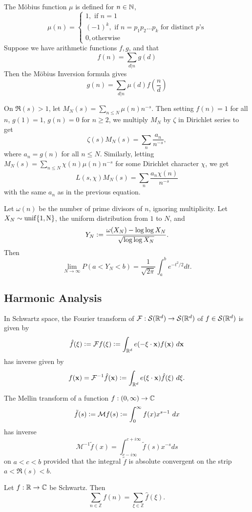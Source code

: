 \begin{theorem}
	The M\"obius function $\mu$ is defined for $n\in\mathbb{N}$,
	\[
		\mu(n) = \begin{cases}
			1, \textrm{ if } n=1\\
			(-1)^k, \textrm{ if }n=p_1p_2...p_k\textrm{ for distinct }p\textrm{'s}\\
			0, \textrm {otherwise}
		\end{cases}
	\]
	Suppose we have arithmetic functions $f,g$, and that\[
		f(n) = \sum_{d|n} g(d)
	\]
	Then the M\"obius Inversion formula gives 
	\[
		g(n) = \sum_{d|n} \mu(d) f\left(\frac{n}{d}\right)
	\]
\end{theorem}
\begin{example}
	On $\Re(s)>1$, let $M_N(s) = \sum_{n\leq N} \mu(n)n^{-s}$.
	Then setting $f(n)=1$ for all $n$, $g(1)=1$, $g(n)=0$ for $n\geq 2$, we multiply $M_N$ by $\zeta$ in Dirichlet series to get\[
		\zeta(s)M_N(s) = \sum_{n} \frac{a_n}{n^{-s}},
	\]
	where $a_n=g(n)$ for all $n\leq N$.
	Similarly, letting $M_N(s) = \sum_{n\leq N} \chi(n) \mu(n) n^{-s}$ for some Dirichlet character $\chi$,
	we get \[
		L(s,\chi)M_N(s) = \sum_{n} \frac{a_n\chi(n)}{n^{-s}}
	\]
	with the same $a_n$ as in the previous equation.
\end{example}
\begin{theorem}
	Let $\omega(n)$ be the number of prime divisors of $n$, ignoring multiplicity. Let $X_N\sim \rm{unif}\{1,N\}$, the uniform distribution from $1$ to $N$, and
	\[
	Y_N\mathrel{\mathop:}= \frac{\omega(X_N)-\log\log X_N}{\sqrt{\log \log X_N}}.
	\] 
	Then \[
	\lim_{N\to\infty} P(a<Y_N<b) = \frac{1}{\sqrt{2\pi}}\int_a^b e^{-t^2/2}dt.
	\]
\end{theorem}
\subsection*{Harmonic Analysis}
\begin{theorem}
	In Schwartz space, the Fourier transform of $\mathcal{F}:\mathcal{S}(\mathbb{R}^d)\to\mathcal{S}(\mathbb{R}^d)$ of $f\in\mathcal{S}(\mathbb{R}^d)$ is given by
    \[
        \hat{f}(\mathbf{\xi})\defeq\mathcal{F}f(\mathbf{\xi})\defeq \int_{\reals^d} e(- \mathbf{\xi}\cdot \mathbf{x}) f(\mathbf{x}) \ d\mathbf{x}
    \]
    has inverse given by 
    \[
       f(\mathbf{x})= \mathcal{F}^{-1}\hat{f}(\mathbf{x})\defeq \int_{\reals^d} e(\mathbf{\xi}\cdot \mathbf{x}) \hat{f}(\mathbf{\xi}) \ d\mathbf{\xi}.
    \]
\end{theorem}
\begin{theorem}
	The Mellin transform of a function $f:(0,\infty)\to\mathbb{C}$
	\[
	\tilde{f}(s) \mathrel{\mathop:}= \mathcal{M}f(s) \mathrel{\mathop:}= \int_{0}^{\infty}f(x) x^{s-1} \ dx
	\]
	has inverse \[
	\mathcal{M}^{-1} \tilde{f} (x) = \int_{c-i\infty}^{c+i\infty} \tilde{f}(s) x^{-s}ds
	\]
	on $a<c<b$ provided that the integral $\tilde{f}$ is absolute convergent on the strip $a<\Re(s)<b$.
\end{theorem}
\begin{theorem}
	Let $f:\mathbb{R}\to\mathbb{C}$ be Schwartz. Then \[
	\sum_{n\in \mathbb{Z}} f(n) = \sum_{\xi\in\mathbb{Z}} \hat{f}(\xi).
	\]
\end{theorem}